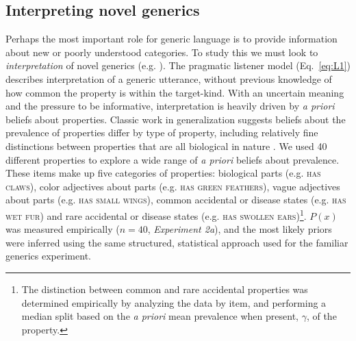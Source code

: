 \documentclass{pnastwo}
\begin{document}
\begin{article}
\subsection{Interpreting novel generics}
Perhaps the most important role for generic language is to provide information about new or poorly understood categories. 
To study this we must look to \emph{interpretation} of novel generics (e.g. \cite{Gelman2002, Cimpian2010}).
The pragmatic listener model (Eq.~\ref{eq:L1}) describes interpretation of a generic utterance, without previous knowledge of how common the property is within the target-kind. 
With an uncertain meaning and the pressure to be informative, interpretation is heavily driven by \emph{a priori} beliefs about properties. 
Classic work in generalization suggests beliefs about the prevalence of properties differ by type of property, including relatively fine distinctions between properties that are all biological in nature \cite{Nisbett1983}. 
We used 40 different properties to explore a wide range of \emph{a priori} beliefs about prevalence. 
These items make up five categories of properties: biological parts (e.g. \textsc{has claws}), color adjectives about parts (e.g. \textsc{has green feathers}), vague adjectives about parts (e.g. \textsc{has small wings}),  common accidental or disease states (e.g. \textsc{has wet fur}) and rare accidental or disease states (e.g. \textsc{has swollen ears})\footnote{The distinction between common and rare accidental properties was determined empirically by analyzing the data by item, and performing a median split based on the \emph{a priori} mean prevalence when present, $\gamma$, of the property.}.
$P(x)$ was measured empirically ($n=40$, {\it Experiment 2a}), and the most likely priors were inferred using the same structured, statistical approach used for the familiar generics experiment.



\end{article}
\end{document}
